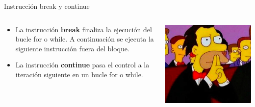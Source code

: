 \documentclass{bredelebeamer}
\begin{document}
\begin{frame}{Instrucción break y continue}
\begin{columns}
\begin{column}{0.5\textwidth}
\begin{itemize}
\item La instrucción \textbf{break} finaliza la ejecución del bucle for o while. A continuación se ejecuta la siguiente instrucción fuera del bloque.
\item La instrucción \textbf{continue} pasa el control a la iteración siguiente en un bucle for o while.
\end{itemize}
\end{column}
\begin{column}{0.5\textwidth}
\begin{center}
\includegraphics[scale=0.3]{images/img40.png}
\end{center}
\end{column}
\end{columns}
\end{frame}







\end{document}
